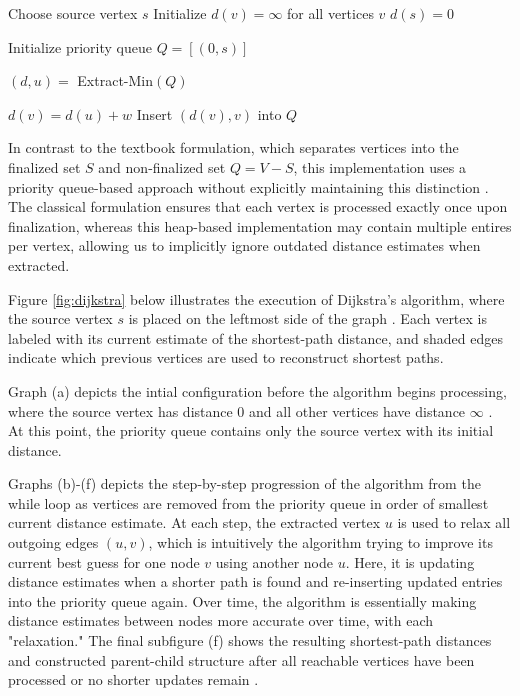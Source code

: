 \documentclass[12pt]{report}
\begin{document}
\begin{algorithm}[H]
\caption{Dijkstra's Algorithm}
\label{alg:dijkstra}
\begin{algorithmic}[1]

\State Choose source vertex $s$
\State Initialize $d(v)=\infty$ for all vertices $v$
\State $d(s)=0$

\State Initialize priority queue
\State $Q=[(0,s)]$


    \State $(d,u) =$ Extract-Min$(Q)$



            \State $d(v)=d(u)+w$
            \State Insert $(d(v),v)$ into $Q$

        \EndIf
    \EndFor
\EndWhile

\end{algorithmic}
\end{algorithm}

In contrast to the textbook formulation, which separates vertices into the finalized set $S$ and non-finalized set $Q = V - S$, this implementation uses a priority queue-based approach without explicitly maintaining this distinction \cite{CLRS}. The classical formulation ensures that each vertex is processed exactly once upon finalization, whereas this heap-based implementation may contain multiple entires per vertex, allowing us to implicitly ignore outdated distance estimates when extracted.

Figure \ref{fig:dijkstra} below illustrates the execution of Dijkstra's algorithm, where the source vertex $s$ is placed on the leftmost side of the graph \cite{CLRS}. Each vertex is labeled with its current estimate of the shortest-path distance, and shaded edges indicate which previous vertices are used to reconstruct shortest paths.

Graph (a) depicts the intial configuration before the algorithm begins processing, where the source vertex has distance 0 and all other vertices have distance $\infty$ \cite{CLRS}. At this point, the priority queue contains only the source vertex with its initial distance.

Graphs (b)-(f) depicts the step-by-step progression of the algorithm from the while loop as vertices are removed from the priority queue in order of smallest current distance estimate. At each step, the extracted vertex $u$ is used to relax all outgoing edges $(u,v)$, which is intuitively the algorithm trying to improve its current best guess for one node $v$ using another node $u$. Here, it is updating distance estimates when a shorter path is found and re-inserting updated entries into the priority queue again. Over time, the algorithm is essentially making distance estimates between nodes more accurate over time, with each "relaxation." The final subfigure (f) shows the resulting shortest-path distances and constructed parent-child structure after all reachable vertices have been processed or no shorter updates remain \cite{CLRS}.
\end{document}
